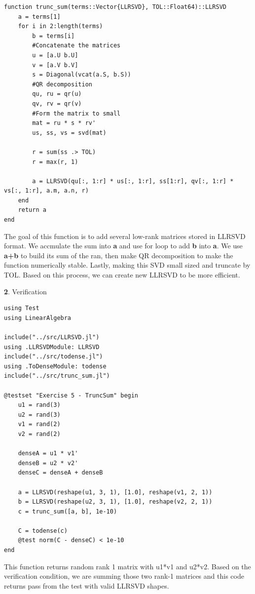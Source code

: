 \documentclass[11pt]{article}
\begin{document}
\begin{lstlisting}
function trunc_sum(terms::Vector{LLRSVD}, TOL::Float64)::LLRSVD
    a = terms[1]
    for i in 2:length(terms)
        b = terms[i]
        #Concatenate the matrices
        u = [a.U b.U]
        v = [a.V b.V]
        s = Diagonal(vcat(a.S, b.S))
        #QR decomposition
        qu, ru = qr(u)
        qv, rv = qr(v)
        #Form the matrix to small
        mat = ru * s * rv'
        us, ss, vs = svd(mat)

        r = sum(ss .> TOL)
        r = max(r, 1)

        a = LLRSVD(qu[:, 1:r] * us[:, 1:r], ss[1:r], qv[:, 1:r] * vs[:, 1:r], a.m, a.n, r)
    end
    return a
end
\end{lstlisting}

The goal of this function is to add several low-rank matrices stored in LLRSVD format. We accmulate the sum into \textbf{a} and use for loop to add \textbf{b} into \textbf{a}. We use \textbf{a+b}  to build its sum of the ran, then make QR decomposition to make the function numerically stable. Lastly, making this SVD small sized and truncate by TOL. Based on this process, we can create new LLRSVD to be more efficient.  

\vspace{1.5em}

\textbf{2}. Verification

\begin{lstlisting}
using Test
using LinearAlgebra

include("../src/LLRSVD.jl")
using .LLRSVDModule: LLRSVD
include("../src/todense.jl")
using .ToDenseModule: todense
include("../src/trunc_sum.jl")

@testset "Exercise 5 - TruncSum" begin
    u1 = rand(3)
    u2 = rand(3)
    v1 = rand(2)
    v2 = rand(2)
    
    denseA = u1 * v1'
    denseB = u2 * v2'
    denseC = denseA + denseB

    a = LLRSVD(reshape(u1, 3, 1), [1.0], reshape(v1, 2, 1))
    b = LLRSVD(reshape(u2, 3, 1), [1.0], reshape(v2, 2, 1))
    c = trunc_sum([a, b], 1e-10)

    C = todense(c)
    @test norm(C - denseC) < 1e-10
end
\end{lstlisting}

This function returns random rank 1 matrix with u1*v1 and u2*v2. Based on the verification condition, we are summing those two rank-1 matrices and this code returns pass from the test with valid LLRSVD shapes.
\end{document}
